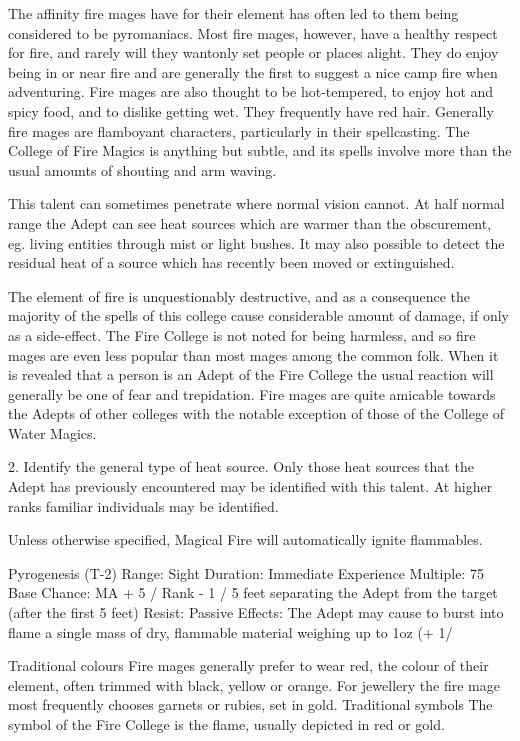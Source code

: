 \documentclass[a4paper]{article}
\begin{document}
\begin{multicols}{3}
The affinity fire mages have for their element has
often led to them being considered to be pyromaniacs. Most fire mages, however, have a healthy
respect for fire, and rarely will they wantonly set
people or places alight. They do enjoy being in or
near fire and are generally the first to suggest a
nice camp fire when adventuring. Fire mages are
also thought to be hot-tempered, to enjoy hot and
spicy food, and to dislike getting wet. They frequently have red hair. Generally fire mages are
flamboyant characters, particularly in their spellcasting. The College of Fire Magics is anything but
subtle, and its spells involve more than the usual
amounts of shouting and arm waving.

This talent can sometimes penetrate where normal
vision cannot. At half normal range the Adept can
see heat sources which are warmer than the obscurement, eg. living entities through mist or light
bushes. It may also possible to detect the residual
heat of a source which has recently been moved or
extinguished.

The element of fire is unquestionably destructive,
and as a consequence the majority of the spells of
this college cause considerable amount of damage,
if only as a side-effect. The Fire College is not
noted for being harmless, and so fire mages are
even less popular than most mages among the
common folk. When it is revealed that a person is
an Adept of the Fire College the usual reaction will
generally be one of fear and trepidation. Fire
mages are quite amicable towards the Adepts of
other colleges with the notable exception of those
of the College of Water Magics.

2. Identify the general type of heat source. Only
those heat sources that the Adept has previously
encountered may be identified with this talent. At
higher ranks familiar individuals may be identified.

Unless otherwise specified, Magical Fire will
automatically ignite flammables.

Pyrogenesis (T-2)
Range: Sight
Duration: Immediate
Experience Multiple: 75
Base Chance: MA + 5 / Rank - 1 / 5 feet separating
the Adept from the target (after the first 5 feet)
Resist: Passive
Effects: The Adept may cause to burst into flame a
single mass of dry, flammable material weighing
up to 1oz (+ 1/

Traditional colours
Fire mages generally prefer to wear red, the colour
of their element, often trimmed with black, yellow
or orange. For jewellery the fire mage most frequently chooses garnets or rubies, set in gold.
Traditional symbols
The symbol of the Fire College is the flame, usually depicted in red or gold.


\end{multicols}
\end{document}
